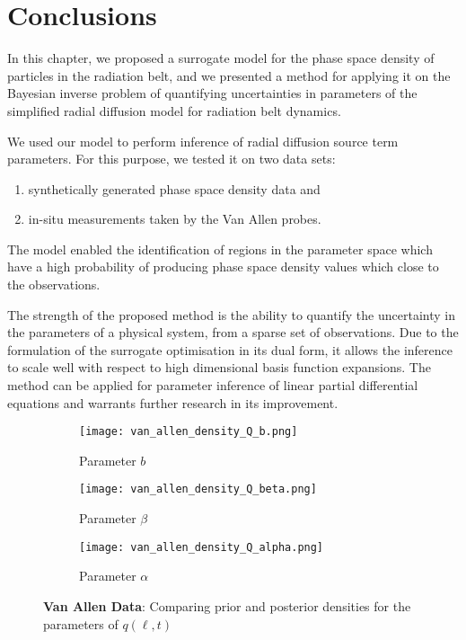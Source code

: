 \section{Conclusions}

In this chapter, we proposed a surrogate model for the phase space density of particles in the 
radiation belt, and we presented a method for applying it on the Bayesian inverse problem of 
quantifying uncertainties in parameters of the simplified radial diffusion model for radiation 
belt dynamics. 

We used our model to perform inference of radial diffusion source term parameters. For this 
purpose, we tested it on two data sets: 
\begin{enumerate}
  \item synthetically generated phase space density data and 
  \item in-situ measurements taken by the Van Allen probes. 
\end{enumerate}
%
The model enabled the identification of regions in the parameter space which have a high 
probability of producing phase space density values which close to the observations.

The strength of the proposed method is the ability to quantify the uncertainty in the parameters of 
a physical system, from a sparse set of observations. Due to the formulation of the surrogate 
optimisation in its dual form, it allows the inference to scale well with respect to high 
dimensional basis function expansions. The method can be applied for parameter inference of 
linear partial differential equations and warrants further research in its improvement.

\begin{figure*}[!htb]
  \centering
  \begin{subfigure}[b]{0.5\textwidth}
    \centering
    \texttt{[image: van\_allen\_density\_Q\_b.png]}
    \caption{{\small Parameter $b$}}
    \label{fig:qbvanAllen}
  \end{subfigure}
  \hfill
  \begin{subfigure}[b]{0.5\textwidth}
    \centering
    \texttt{[image: van\_allen\_density\_Q\_beta.png]}
    \caption{{\small Parameter $\beta$}}
    \label{fig:qbetavanAllen}
  \end{subfigure}
  \hfill
  \begin{subfigure}[b]{0.5\textwidth}
    \centering
    \texttt{[image: van\_allen\_density\_Q\_alpha.png]}
    \caption{{\small Parameter $\alpha$}}
    \label{fig:qalphavanAllen}
  \end{subfigure}
  \caption{
    \textbf{Van Allen Data}: Comparing prior and posterior densities 
    for the parameters of $q(\ell, t)$}  
\end{figure*}

